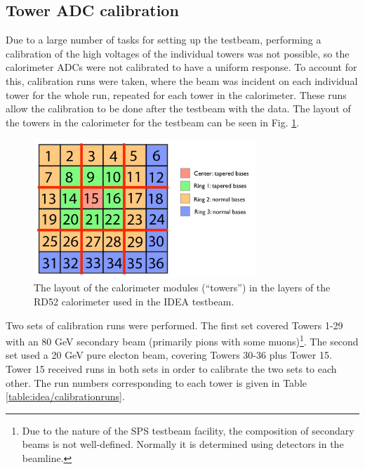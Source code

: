\subsection{Tower ADC calibration}
\label{section:tower-calibration}
Due to a large number of tasks for setting up the testbeam, performing a calibration of the high voltages of the individual towers was not possible, so the calorimeter \acrshort{ADC}s were not calibrated to have a uniform response. To account for this, calibration runs were taken, where the beam was incident on each individual tower for the whole run, repeated for each tower in the calorimeter. These runs allow the calibration to be done after the testbeam with the data. The layout of the towers in the calorimeter for the testbeam can be seen in Fig. \ref{figure:testbeam/results/tower-layout}.

\begin{figure}[h]
	\centering
	\includegraphics[width=0.75\textwidth]{../Pictures/IDEA/RD52-towers.jpg}
	\caption{The layout of the calorimeter modules (``towers'') in the layers of the RD52 calorimeter used in the \acrshort{IDEA} testbeam.}
	\label{figure:testbeam/results/tower-layout}
\end{figure}

Two sets of calibration runs were performed. The first set covered Towers 1-29 with an 80 GeV secondary beam (primarily pions with some muons)\footnote{Due to the nature of the \acrshort{SPS} testbeam facility, the composition of secondary beams is not well-defined. Normally it is determined using detectors in the beamline.}. The second set used a 20 GeV pure electon beam, covering Towers 30-36 plus Tower 15. Tower 15 received runs in both sets in order to calibrate the two sets to each other. The run numbers corresponding to each tower is given in Table \ref{table:idea/calibrationruns}.

